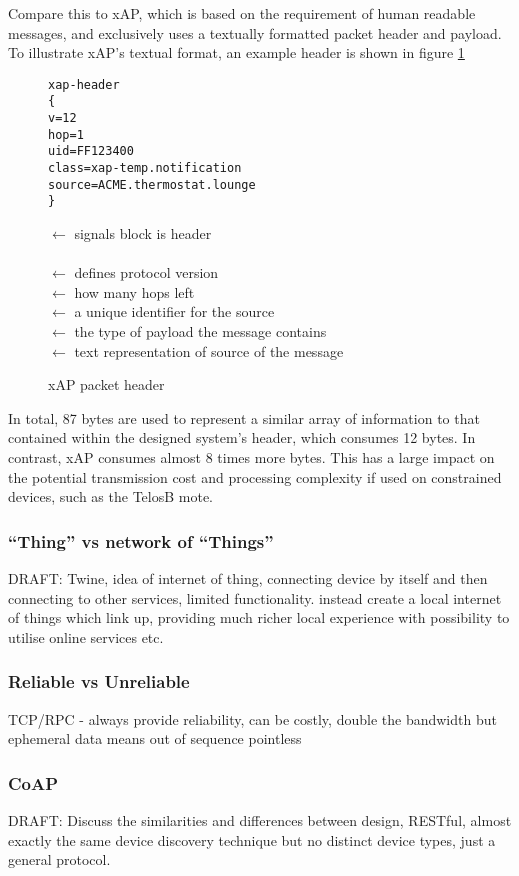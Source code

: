 Compare this to xAP, which is based on the requirement of human readable messages, and exclusively uses a textually formatted packet header and payload. To illustrate xAP's textual format, an example header is shown in figure \ref{fig:xapHeader}
\begin{figure}[h!]
\begin{minipage}{.5\textwidth}
\begin{verbatim}
xap-header
{
v=12
hop=1
uid=FF123400
class=xap-temp.notification
source=ACME.thermostat.lounge
}
\end{verbatim}
\end{minipage}%
\begin{minipage}{.5\textwidth}
$\leftarrow$ signals block is header\\
\\
$\leftarrow$ defines protocol version\\
$\leftarrow$ how many hops left\\
$\leftarrow$ a unique identifier for the source\\
$\leftarrow$ the type of payload the message contains\\
$\leftarrow$ text representation of source of the message\\
\end{minipage}
\caption{xAP packet header}
\label{fig:xapHeader}
\end{figure}
In total, 87 bytes are used to represent a similar array of information to that contained within the designed system's header, which consumes 12 bytes. In contrast, xAP consumes almost 8 times more bytes. This has a large impact on the potential transmission cost and processing complexity if used on constrained devices, such as the TelosB mote.

\subsubsection{``Thing'' vs network of ``Things''} %
\label{ssub:_thing_vs_network_of_things_}
DRAFT: Twine, idea of internet of thing, connecting device by itself and then connecting to other services, limited functionality. instead create a local internet of things which link up, providing much richer local experience with possibility to utilise online services etc.

\subsubsection{Reliable vs Unreliable} %
\label{ssub:reliable_vs_unreliable}
TCP/RPC - always provide reliability, can be costly, double the bandwidth but ephemeral data means out of sequence pointless

\subsubsection{CoAP} %
\label{ssub:coap}
DRAFT: Discuss the similarities and differences between design, RESTful, almost exactly the same device discovery technique but no distinct device types, just a general protocol.

